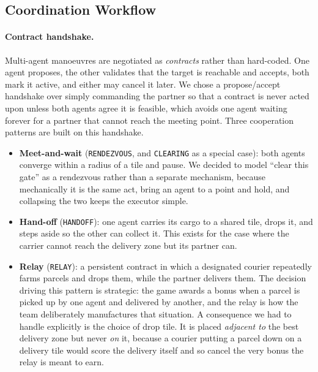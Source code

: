 \documentclass[a4paper,11pt]{article}
\begin{document}
\subsection{Coordination Workflow}

\paragraph{Contract handshake.} Multi-agent manoeuvres are negotiated as
\emph{contracts} rather than hard-coded. One agent proposes, the other validates that
the target is reachable and accepts, both mark it active, and either may cancel it
later. We chose a propose/accept handshake over simply commanding the partner so that
a contract is never acted upon unless both agents agree it is feasible, which avoids
one agent waiting forever for a partner that cannot reach the meeting point. Three
cooperation patterns are built on this handshake.

\begin{itemize}
  \item \textbf{Meet-and-wait} (\texttt{RENDEZVOUS}, and \texttt{CLEARING} as a
        special case): both agents converge within a radius of a tile and pause. We
        decided to model ``clear this gate'' as a rendezvous rather than a separate
        mechanism, because mechanically it is the same act, bring an agent to a point
        and hold, and collapsing the two keeps the executor simple.
  \item \textbf{Hand-off} (\texttt{HANDOFF}): one agent carries its cargo to a shared
        tile, drops it, and steps aside so the other can collect it. This exists for
        the case where the carrier cannot reach the delivery zone but its partner can.
  \item \textbf{Relay} (\texttt{RELAY}): a persistent contract in which a designated
        courier repeatedly farms parcels and drops them, while the partner delivers
        them. The decision driving this pattern is strategic: the game awards a bonus
        when a parcel is picked up by one agent and delivered by another, and the
        relay is how the team deliberately manufactures that situation. A consequence
        we had to handle explicitly is the choice of drop tile. It is placed
        \emph{adjacent to} the best delivery zone but never \emph{on} it, because a
        courier putting a parcel down on a delivery tile would score the delivery
        itself and so cancel the very bonus the relay is meant to earn.
\end{itemize}
\end{document}
